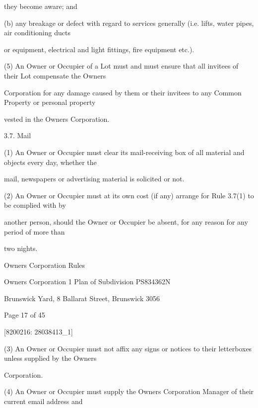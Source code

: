 \documentclass{article}
\begin{document}
{\fontsize{10.02}{1}they become aware; and }

{\fontsize{9.962}{1}(b) any breakage or defect with regard to services generally (i.e. lifts, water pipes, air conditioning ducts }

{\fontsize{10.02}{1}or equipment, electrical and light fittings, fire equipment etc.). }

{\fontsize{9.962}{1}(5) An Owner or Occupier of a Lot must and must ensure that all invitees of their Lot compensate the Owners }

{\fontsize{10.02}{1}Corporation for any damage caused by them or their invitees to any Common Property or personal property }

{\fontsize{10.02}{1}vested in the Owners Corporation. }

{\fontsize{9.99}{1}3.7. Mail }

{\fontsize{9.962}{1}(1) An Owner or Occupier must clear its mail-receiving box of all material and objects every day, whether the }

{\fontsize{10.02}{1}mail, newspapers or advertising material is solicited or not. }

{\fontsize{9.962}{1}(2) An Owner or Occupier must at its own cost (if any) arrange for Rule 3.7(1) to be complied with by }

{\fontsize{10.02}{1}another person, should the Owner or Occupier be absent, for any reason for any period of more than }

{\fontsize{10.02}{1}two nights. }

\newpage





{\fontsize{9}{1}Owners Corporation Rules }

{\fontsize{9}{1}Owners Corporation 1 Plan of Subdivision PS834362N }

{\fontsize{9}{1}Brunswick Yard, 8 Ballarat Street, Brunswick 3056 }


{\fontsize{9}{1}Page 17  of 45 }



{\fontsize{7.02}{1}[8200216: 28038413\_1] }


{\fontsize{9.962}{1}(3) An Owner or Occupier must not affix any signs or notices to their letterboxes unless supplied by the Owners }

{\fontsize{10.02}{1}Corporation. }

{\fontsize{9.962}{1}(4) An Owner or Occupier must supply the Owners Corporation Manager of their current email address and }
\end{document}
